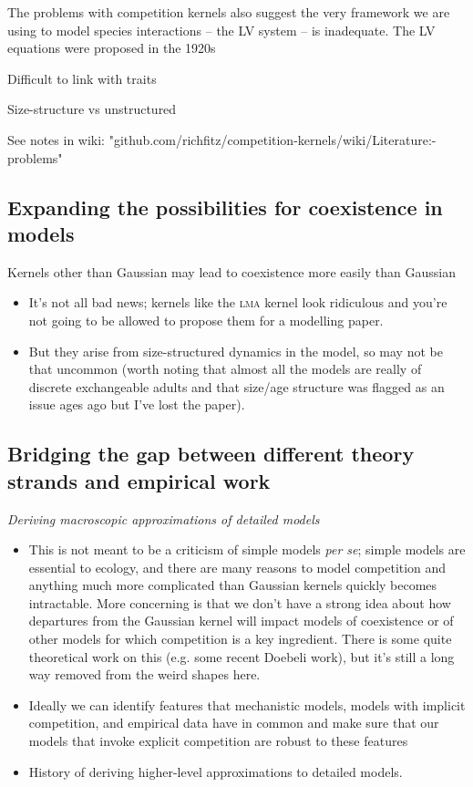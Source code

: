 \documentclass[a4paper,11pt]{article}
\begin{document}
The problems with competition kernels also suggest the very framework we are
using to model species interactions -- the LV system -- is inadequate. The
LV equations were proposed in the 1920s \citep{Volterra-1928}


Difficult to link with traits

Size-structure vs unstructured

See notes in wiki:
"github.com/richfitz/competition-kernels/wiki/Literature:-problems"

\subsection{Expanding the possibilities for coexistence in models}

Kernels other than Gaussian may lead to coexistence more easily
  than Gaussian

\begin{itemize}
\item It's not all bad news; kernels like the \textsc{lma} kernel look
  ridiculous and you're not going to be allowed to propose them for
  a modelling paper.
\item But they arise from size-structured dynamics in the model, so
  may not be that uncommon (worth noting that almost all the models
  are really of discrete exchangeable adults and that size/age
  structure was flagged as an issue ages ago but I've lost the
  paper).
\end{itemize}


\subsection{Bridging the gap between different theory strands and 
empirical work}

\textit{Deriving macroscopic approximations of detailed models}

\begin{itemize}
 \item This is not meant to be a criticism of simple models \textit{per
  se}; simple models are essential to ecology, and there are many
  reasons to model competition and anything much more complicated than
  Gaussian kernels quickly becomes intractable.  More concerning is
  that we don't have a strong idea about how departures from the
  Gaussian kernel will impact models of coexistence or of other models
  for which competition is a key ingredient.  There is some quite
  theoretical work on this (e.g. some recent Doebeli work), but it's
  still a long way removed from the weird shapes here.
\item Ideally we can identify features that mechanistic models, models
  with implicit competition, and empirical data have in common and make
  sure that our models that invoke explicit competition are robust to
  these features
\item History of deriving higher-level approximations to detailed models. 
\end{itemize}
\end{document}
